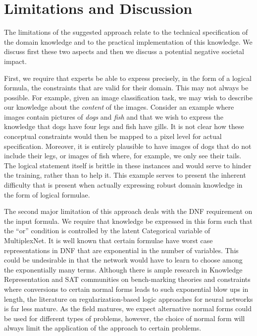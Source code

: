 \documentclass[letterpaper]{article} %
\begin{document}

\section{Limitations and Discussion}
\label{sec:limitations}
The limitations of the suggested approach relate to the technical specification of the domain knowledge and to the practical implementation of this knowledge.
We discuss first these two aspects and then we discuss a potential negative societal impact.

First, we require that experts be able to express precisely, in the form of a logical formula, the constraints that are valid for their domain.
This may not always be possible.
For example, given an image classification task, we may wish to describe our knowledge about the \textit{content} of the images.
Consider an example where images contain pictures of \textit{dogs} and \textit{fish} and that we wish to express the knowledge that dogs have four legs and fish have gills.
It is not clear how these conceptual constraints would then be mapped to a pixel level for actual specification.
Moreover, it is entirely plausible to have images of dogs that do not include their legs, or images of fish where, for example, we only see their tails.
The logical statement itself is brittle in these instances and would serve to hinder the training, rather than to help it.
This example serves to present the inherent difficulty that is present when actually expressing robust domain knowledge in the form of logical formulae.

The second major limitation of this approach deals with the DNF requirement on the input formula. 
We require that knowledge be expressed in this form such that the ``or'' condition is controlled by the latent Categorical variable of MultiplexNet. 
It is well known that certain formulae have worst case representations in DNF that are exponential in the number of variables.
This could be undesirable in that the network would have to learn to choose among the exponentially many terms.
Although there is ample research in Knowledge Representation and SAT communities on bench-marking theories and constraints where conversions to certain normal forms leads to such exponential blow ups in length, the literature on regularization-based logic approaches for neural networks is far less mature.
As the field matures, we expect alternative normal forms could be used for different types of problems, however, the choice of normal form will always limit the application of the approach to certain problems.
\end{document}
